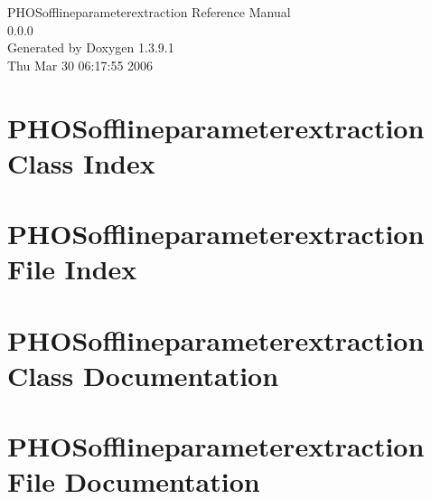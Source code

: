 \documentclass[a4paper]{book}
\begin{document}
\begin{titlepage}
\vspace*{7cm}
\begin{center}
{\Large PHOSofflineparameterextraction Reference Manual\\[1ex]\large 0.0.0 }\\
\vspace*{1cm}
{\large Generated by Doxygen 1.3.9.1}\\
\vspace*{0.5cm}
{\small Thu Mar 30 06:17:55 2006}\\
\end{center}
\end{titlepage}
\clearemptydoublepage
{}
\tableofcontents
\clearemptydoublepage
{}
\chapter{PHOSofflineparameterextraction Class Index}

\chapter{PHOSofflineparameterextraction File Index}

\chapter{PHOSofflineparameterextraction Class Documentation}


\chapter{PHOSofflineparameterextraction File Documentation}





\printindex
\end{document}
